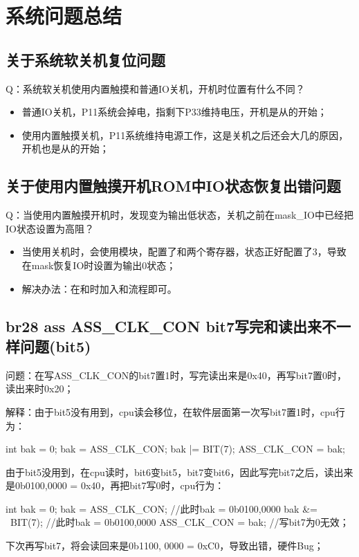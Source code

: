 \section{系统问题总结}
\subsection{关于系统软关机复位问题}
Q：系统软关机使用内置触摸和普通IO关机，开机时位置有什么不同？
\begin{itemize}
    \item 普通IO关机，P11系统会掉电，指剩下P33维持电压，开机是从的开始；
    \item 使用内置触摸关机，P11系统维持电源工作，这是关机之后还会大几的原因，开机也是从的开始；
\end{itemize}

\subsection{关于使用内置触摸开机ROM中IO状态恢复出错问题}
Q：当使用内置触摸开机时，发现变为输出低状态，关机之前在mask\_IO中已经把IO状态设置为高阻？
\begin{itemize}
    \item 当使用关机时，会使用模块，配置了和两个寄存器，状态正好配置了3，导致在mask恢复IO时设置为输出0状态；
    \item 解决办法：在和时加入和流程即可。
\end{itemize}

\subsection{br28 ass ASS\_CLK\_CON bit7写完和读出来不一样问题(bit5)}
问题：在写ASS\_CLK\_CON的bit7置1时，写完读出来是0x40，再写bit7置0时，读出来时0x20；

解释：由于bit5没有用到，cpu读会移位，在软件层面第一次写bit7置1时，cpu行为：
\begin{myccode}[caption={bit7置1 cpu行为}]
    {
        int bak = 0;
        bak = ASS_CLK_CON;
        bak |= BIT(7);
        ASS_CLK_CON = bak;
    }
\end{myccode}
由于bit5没用到，在cpu读时，bit6变bit5，bit7变bit6，因此写完bit7之后，读出来是0b0100,0000 = 0x40，再把bit7写0时，cpu行为：
\begin{myccode}[caption={bit7置0 cpu行为}]
    {
        int bak = 0;
        bak = ASS_CLK_CON;  //此时bak = 0b0100,0000
        bak &= ~BIT(7);     //此时bak = 0b0100,0000
        ASS_CLK_CON = bak;  //写bit7为0无效；
    }
\end{myccode}
下次再写bit7，将会读回来是0b1100, 0000 = 0xC0，导致出错，硬件Bug；

